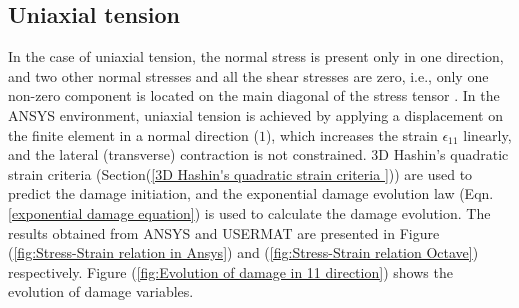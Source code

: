 \documentclass[12pt,a4paper,twoside,openright]{report}
\begin{document}
\subsection{Uniaxial tension}
\indent\indent\indent In the case of uniaxial tension, the normal stress is present only in one direction, and two other normal stresses and all the shear stresses are zero, i.e., only one non-zero component is located on the main diagonal of the stress tensor \citep{ubt}.  In the ANSYS environment, uniaxial tension is achieved by applying a displacement on the finite element in a normal direction ($1$), which increases the strain $\epsilon_{11}$ linearly, and the lateral (transverse) contraction is not constrained. 3D Hashin's quadratic strain criteria (Section(\ref{3D Hashin's quadratic strain criteria })) are used to predict the damage initiation, and the exponential damage evolution law (Eqn.\ref{exponential damage equation}) is used to calculate the damage evolution. The results obtained from ANSYS and USERMAT are presented in Figure (\ref{fig:Stress-Strain relation in Ansys}) and (\ref{fig:Stress-Strain relation Octave}) respectively. Figure (\ref{fig:Evolution of damage in 11 direction}) shows the evolution of damage variables.\\ 
\end{document}
